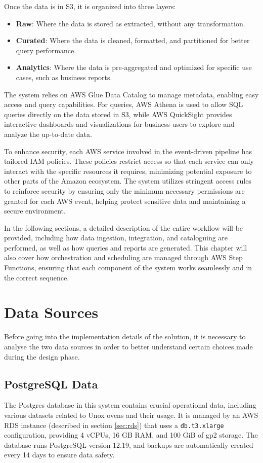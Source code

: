 Once the data is in \ac{S3}, it is organized into three layers:
\begin{itemize}
    \item \textbf{Raw}: Where the data is stored as extracted, without any transformation.
    \item \textbf{Curated}: Where the data is cleaned, formatted, and partitioned for better query performance.
    \item \textbf{Analytics}: Where the data is pre-aggregated and optimized for specific use cases, such as business reports.
\end{itemize}
The system relies on \ac{AWS} Glue Data Catalog to manage metadata, enabling easy access and query capabilities. For queries, \ac{AWS} Athena is used to allow \ac{SQL} queries directly on the data stored in \ac{S3}, while \ac{AWS} QuickSight provides interactive dashboards and visualizations for business users to explore and analyze the up-to-date data.

To enhance security, each \ac{AWS} service involved in the event-driven pipeline has tailored \ac{IAM} policies. These policies restrict access so that each service can only interact with the specific resources it requires, minimizing potential exposure to other parts of the Amazon ecosystem. The system utilizes stringent access rules to reinforce security by ensuring only the minimum necessary permissions are granted for each \ac{AWS} event, helping protect sensitive data and maintaining a secure environment.

In the following sections, a detailed description of the entire workflow will be provided, including how data ingestion, integration, and cataloguing are performed, as well as how queries and reports are generated. This chapter will also cover how orchestration and scheduling are managed through \ac{AWS} Step Functions, ensuring that each component of the system works seamlessly and in the correct sequence.


\section{Data Sources}
Before going into the implementation details of the solution, it is necessary to analyse the two data sources in order to better understand certain choices made during the design phase.
\subsection{PostgreSQL Data}
\label{sec:postgresdata}
The Postgres database in this system contains crucial operational data, including various datasets related to Unox ovens and their usage. It is managed by an \ac{AWS} \ac{RDS} instance (described in section \ref{sec:rds}) that uses a \texttt{db.t3.xlarge} configuration, providing 4 vCPUs, 16 GB \ac{RAM}, and 100 GiB of gp2 storage. The database runs PostgreSQL version 12.19, and backups are automatically created every 14 days to ensure data safety.

